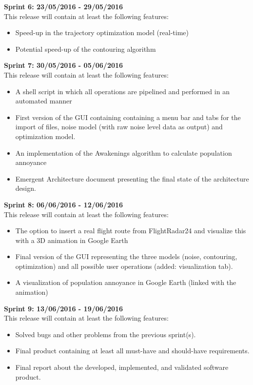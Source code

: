 \textbf{Sprint 6: 23/05/2016 - 29/05/2016} \\
This release will contain at least the following features:
\begin{itemize}
\item Speed-up in the trajectory optimization model (real-time)
\item Potential speed-up of the contouring algorithm
\end{itemize}

\textbf{Sprint 7: 30/05/2016 - 05/06/2016} \\
This release will contain at least the following features:
\begin{itemize}
\item A shell script in which all operations are pipelined and performed in an automated manner
\item First version of the GUI containing containing a menu bar and tabs for the import of files, noise model (with raw noise level data as output) and optimization model.
\item An implementation of the Awakenings algorithm to calculate population annoyance
\item Emergent Architecture document presenting the final state of the architecture design. 
\end{itemize}

\textbf{Sprint 8: 06/06/2016 - 12/06/2016} \\
This release will contain at least the following features:
\begin{itemize}
\item The option to insert a real flight route from FlightRadar24 and visualize this with a 3D animation in Google Earth
\item Final version of the GUI representing the three models (noise, contouring, optimization) and all possible user operations (added: visualization tab).
\item A visualization of population annoyance in Google Earth (linked with the animation)
\end{itemize}

\textbf{Sprint 9: 13/06/2016 - 19/06/2016} \\
This release will contain at least the following features:
\begin{itemize}
\item Solved bugs and other problems from the previous sprint(s).
\item Final product containing at least all must-have and should-have requirements.
\item Final report about the developed, implemented, and validated software product.
\end{itemize}

\newpage 